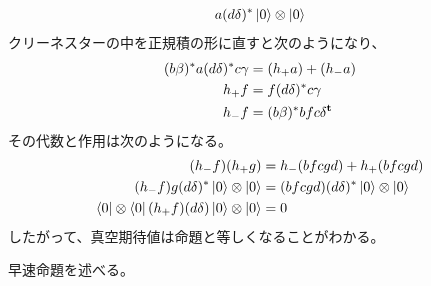 {\begin{note}[証明のカギ]
\begin{description}
\begin{equation*}
\begin{split}
					a(d\delta)^*\mathinner{|{0}\rangle}\otimes\mathinner{|{0}\rangle}
			\end{split}\end{equation*}
			クリーネスターの中を正規積の形に直すと次のようになり、
			\begin{equation*}\begin{split}
				(b\beta)^*a(d\delta)^*c\gamma &= (h_+a) + (h_-a) \\
				h_+f &= f(d\delta)^*c\gamma \\
				h_-f &= (b\beta)^*bfc\delta^{\mathbf{t}} \\
			\end{split}\end{equation*}
			その代数と作用は次のようになる。
			\begin{equation*}\begin{split}
				(h_-f)(h_+g) &= h_-(bfcgd) + h_+(bfcgd) \\
				(h_-f)g(d\delta)^*\mathinner{|{0}\rangle}\otimes\mathinner{|{0}\rangle}
					&= (bfcgd)(d\delta)^*\mathinner{|{0}\rangle}\otimes\mathinner{|{0}\rangle} \\
				\mathinner{\langle{0}|}\otimes\mathinner{\langle{0}|}(h_+f)(d\delta)\mathinner{|{0}\rangle}\otimes\mathinner{|{0}\rangle} &= 0 \\
			\end{split}\end{equation*}
			したがって、真空期待値は命題と等しくなることがわかる。
		\end{description} %
	\end{note} %

	早速命題を述べる。

}

